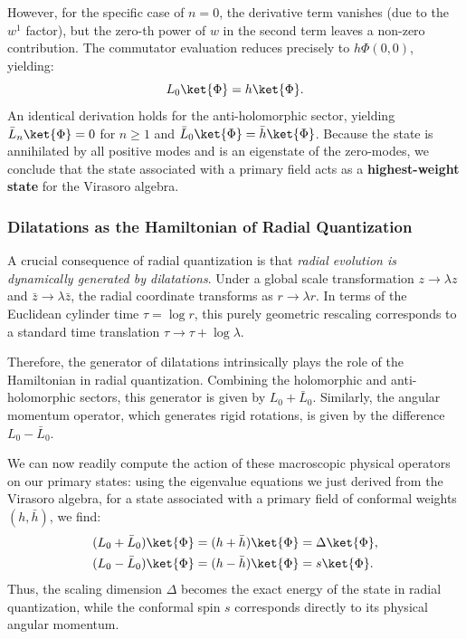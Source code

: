 However, for the specific case of \(n = 0\), the derivative term vanishes (due to the \(w^1\) factor), but the zero-th power of \(w\) in the second term leaves a non-zero contribution. The commutator evaluation reduces precisely to \(h \Phi(0,0)\), yielding:
\[
    L_0 \ket{\Phi} = h \ket{\Phi}.
\]
An identical derivation holds for the anti-holomorphic sector, yielding \(\bar{L}_n \ket{\Phi} = 0\) for \(n \ge 1\) and \(\bar{L}_0 \ket{\Phi} = \bar{h} \ket{\Phi}\). Because the state is annihilated by all positive modes and is an eigenstate of the zero-modes, we conclude that the state associated with a primary field acts as a \textbf{highest-weight state} for the Virasoro algebra.

\subsubsection{Dilatations as the Hamiltonian of Radial Quantization}

A crucial consequence of radial quantization is that \textit{radial evolution is dynamically generated by dilatations}. Under a global scale transformation \(z \to \lambda z\) and \(\bar{z} \to \lambda \bar{z}\), the radial coordinate transforms as \(r \to \lambda r\). In terms of the Euclidean cylinder time \(\tau = \log r\), this purely geometric rescaling corresponds to a standard time translation \(\tau \to \tau + \log \lambda\).

Therefore, the generator of dilatations intrinsically plays the role of the Hamiltonian in radial quantization. Combining the holomorphic and anti-holomorphic sectors, this generator is given by \(L_0 + \bar{L}_0\). Similarly, the angular momentum operator, which generates rigid rotations, is given by the difference \(L_0 - \bar{L}_0\).

We can now readily compute the action of these macroscopic physical operators on our primary states: using the eigenvalue equations we just derived from the Virasoro algebra, for a state associated with a primary field of conformal weights \((h, \bar{h})\), we find:
\[
    \begin{aligned}
        (L_0 + \bar{L}_0) \ket{\Phi} & = (h + \bar{h}) \ket{\Phi} = \Delta \ket{\Phi}, \\
        (L_0 - \bar{L}_0) \ket{\Phi} & = (h - \bar{h}) \ket{\Phi} = s \ket{\Phi}.
    \end{aligned}
\]
Thus, the scaling dimension \(\Delta\) becomes the exact energy of the state in radial quantization, while the conformal spin \(s\) corresponds directly to its physical angular momentum.

